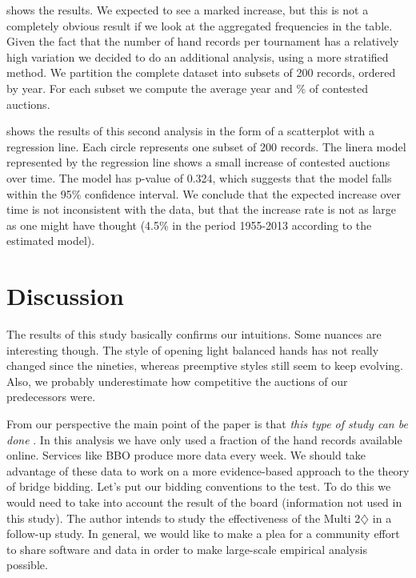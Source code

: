 \documentclass{llncs}
\begin{document}
 shows the results. We expected to see a
marked increase, but this is not a completely obvious result if we
look at the aggregated frequencies in the table. Given the fact that
the number of hand records per tournament has a relatively high
variation we decided to do an additional analysis, using a more
stratified method. We partition the complete dataset into subsets of
200 records, ordered by year. For each subset we compute the average
year and \% of contested auctions.


 shows the results of this second analysis
in the form of a scatterplot with a regression line. Each circle
represents one subset of 200 records. The linera model represented by
the regression line shows a small increase of contested auctions over
time. The model has p-value of 0.324, which suggests that the model
falls within the 95\% confidence interval. We conclude that the
expected increase over time is not inconsistent with the data, but
that the increase rate is not as large as one might have thought
(4.5\% in the period 1955-2013 according to the estimated model).

\section{Discussion}
\label{sec:discussion}

The results of this study basically confirms our intuitions. Some
nuances are interesting though. The style of opening light balanced
hands has not really changed since the nineties, whereas preemptive
styles still seem to keep evolving. Also, we probably underestimate
how competitive the auctions of our predecessors were.

From our perspective the main point of the paper is that \emph{this
type of study can be done} . In this analysis we have only used a
fraction of the hand records available online. Services like BBO
produce more data every week.  We should take advantage of these data
to work on a more evidence-based approach to the theory of bridge
bidding.  Let's put our bidding conventions to the test. To do this we
would need to take into account the result of the board (information
not used in this study). The author intends to study the effectiveness
of the Multi 2$\diamondsuit$ in a follow-up study.  In general, we
would like to make a plea for a community effort to share software and
data in order to make large-scale empirical analysis possible.
\end{document}
